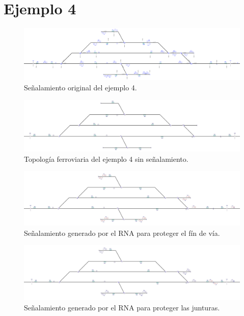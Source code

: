 \section{Ejemplo 4}

    \lipsum[1]

    \begin{figure}[h]
        \centering
        \includegraphics[width=1\textwidth]{resultados-obtenidos/ejemplo4/images/4_original.png}
        \centering\caption{Señalamiento original del ejemplo 4.}
    \end{figure}

    \lipsum[1]
    
    \begin{figure}[h]
        \centering
        \includegraphics[width=1\textwidth]{resultados-obtenidos/ejemplo4/images/4_empty.png}
        \centering\caption{Topología ferroviaria del ejemplo 4 sin señalamiento.}
    \end{figure}

    \begin{figure}[h]
        \centering
        \includegraphics[width=1\textwidth]{resultados-obtenidos/ejemplo4/images/4_step1.png}
        \centering\caption{Señalamiento generado por el RNA para proteger el fín de vía.}
    \end{figure}

    \begin{figure}[h]
        \centering
        \includegraphics[width=1\textwidth]{resultados-obtenidos/ejemplo4/images/4_step2.png}
        \centering\caption{Señalamiento generado por el RNA para proteger las junturas.}
    \end{figure}

